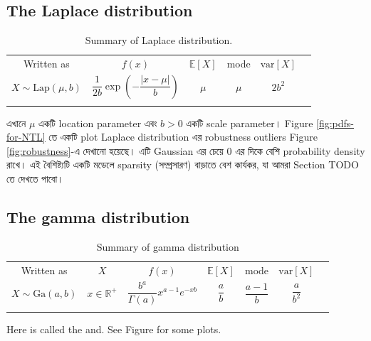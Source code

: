 \documentclass[graybox, envcountchap, twocolumn]{styles/svmult}
\begin{document}
\subsection{The Laplace distribution}


\begin{table}
\caption{Summary of Laplace distribution.}
\centering
\begin{tabular}{cccccc}
\hline\noalign{\smallskip}
Written as & $f(x)$ & $\mathbb{E}[X]$ & mode & $\text{var}[X]$ \\
\noalign{\smallskip}\svhline\noalign{\smallskip}
$X \sim \text{Lap}(\mu,b)$ & $\dfrac{1}{2b}\exp\left(-\dfrac{|x-\mu|}{b}\right)$ & $\mu$ & $\mu$ & $2b^2$ \\
\noalign{\smallskip}\hline
\end{tabular}
\end{table}
{\bengalifont এখানে $\mu$ একটি location parameter এবং $b>0$ একটি scale parameter। Figure \ref{fig:pdfs-for-NTL} তে একটি plot}
{\bengalifont Laplace distribution এর robustness outliers Figure \ref{fig:robustness}-এ দেখানো হয়েছে। এটি Gaussian এর চেয়ে 0 এর দিকে বেশি probability density রাখে। এই বৈশিষ্ট্যটি একটি মডেলে sparsity (সম্প্রসারণ) বাড়াতে বেশ কার্যকর, যা আমরা Section TODO তে দেখতে পাবো।}



\subsection{The gamma distribution}

\begin{table}
\caption{Summary of gamma distribution}
\centering
\begin{tabular}{ccccccc}
\hline\noalign{\smallskip}
Written as & $X$ & $f(x)$ & $\mathbb{E}[X]$ & mode & $\text{var}[X]$ \\
\noalign{\smallskip}\svhline\noalign{\smallskip}
$X \sim \text{Ga}(a,b)$ & $x \in \mathbb{R}^+$ & $\dfrac{b^a}{\Gamma(a)}x^{a-1}e^{-xb}$ & $\dfrac{a}{b}$ & $\dfrac{a-1}{b}$ & $\dfrac{a}{b^2}$ \\
\noalign{\smallskip}\hline
\end{tabular}
\end{table} 
Here  is called the  and. See Figure  for some plots.
\end{document}
